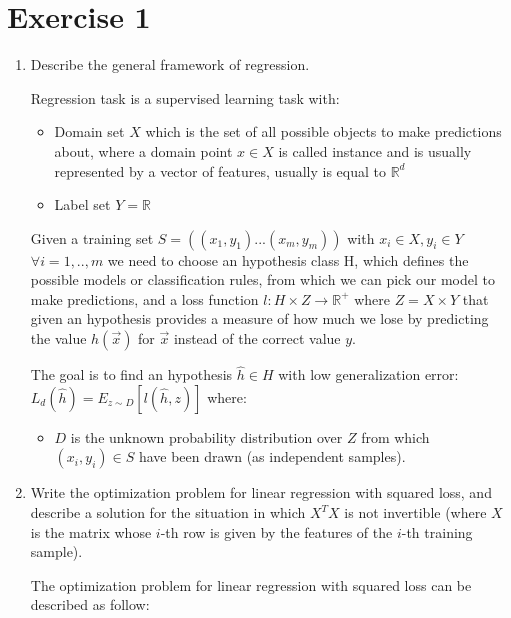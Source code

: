 \documentclass[a4paper,11pt,oneside]{book}
\begin{document}
\section{Exercise 1}
\begin{enumerate}
\item Describe the general framework of regression.
    \begin{solution}
        Regression task is a supervised learning task with:
        
        \begin{itemize}
        \item Domain set $X$ which is the set of all possible objects to make predictions about, where a domain point $x \in X$ is called instance and is usually represented by a vector of features, usually is equal to $\mathbb{R}^d$
        
        \item Label set $Y = \mathbb{R}$
        \end{itemize}
        
        Given a training set $S = ((x_1, y_1) ... (x_m, y_m))$ with $x_i \in X, y_i \in Y$ $\forall i = 1,..,m$ we need to choose an hypothesis class H, which defines the possible models or classification rules, from which we can pick our model to make predictions, and a loss function $l: H \times Z \to \mathbb{R}^+$ where $Z = X \times Y$ that given an hypothesis provides a measure of how much we lose by predicting the value $h(\vec{x})$ for $\vec{x}$ instead of the correct value $y$.
        
        The goal is to find an hypothesis $\hat{h} \in H$ with low generalization error: $L_d(\hat{h}) = E_{z\sim D}[l(\hat{h},z)]$ where:
        
        \begin{itemize}
        \item $D$ is the unknown probability distribution over $Z$ from which $(x_i, y_i) \in S$ have been drawn (as independent samples).
        \end{itemize}
    \end{solution}
\clearpage
\item Write the optimization problem for linear regression with squared loss, and describe a solution for the situation in which $X^TX$ is not invertible (where $X$ is the matrix whose $i$-th row is given by the features of the $i$-th training sample).
    \begin{solution}

        The optimization problem for linear regression with squared loss can be described as follow:
        

\end{solution}
\end{enumerate}
\end{document}
